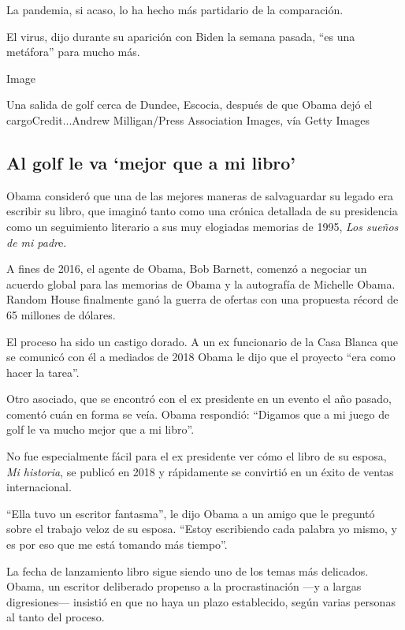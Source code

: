 La pandemia, si acaso, lo ha hecho más partidario de la comparación.

El virus, dijo durante su aparición con Biden la semana pasada, ``es una
metáfora'' para mucho más.

Image

Una salida de golf cerca de Dundee, Escocia, después de que Obama dejó
el cargoCredit...Andrew Milligan/Press Association Images, vía Getty
Images

\hypertarget{al-golf-le-va-mejor-que-a-mi-libro}{%
\subsection{Al golf le va `mejor que a mi
libro'}\label{al-golf-le-va-mejor-que-a-mi-libro}}

Obama consideró que una de las mejores maneras de salvaguardar su legado
era escribir su libro, que imaginó tanto como una crónica detallada de
su presidencia como un seguimiento literario a sus muy elogiadas
memorias de 1995, \emph{Los sueños de mi padr}e.

A fines de 2016, el agente de Obama, Bob Barnett, comenzó a negociar un
acuerdo global para las memorias de Obama y la autografía de Michelle
Obama. Random House finalmente ganó la guerra de ofertas con una
propuesta récord de 65 millones de dólares.

El proceso ha sido un castigo dorado. A un ex funcionario de la Casa
Blanca que se comunicó con él a mediados de 2018 Obama le dijo que el
proyecto ``era como hacer la tarea''.

Otro asociado, que se encontró con el ex presidente en un evento el año
pasado, comentó cuán en forma se veía. Obama respondió: ``Digamos que a
mi juego de golf le va mucho mejor que a mi libro''.

No fue especialmente fácil para el ex presidente ver cómo el libro de su
esposa, \emph{Mi historia}, se publicó en 2018 y rápidamente se
convirtió en un éxito de ventas internacional.

``Ella tuvo un escritor fantasma'', le dijo Obama a un amigo que le
preguntó sobre el trabajo veloz de su esposa. ``Estoy escribiendo cada
palabra yo mismo, y es por eso que me está tomando más tiempo''.

La fecha de lanzamiento libro sigue siendo uno de los temas más
delicados. Obama, un escritor deliberado propenso a la procrastinación
---y a largas digresiones--- insistió en que no haya un plazo
establecido, según varias personas al tanto del proceso.

